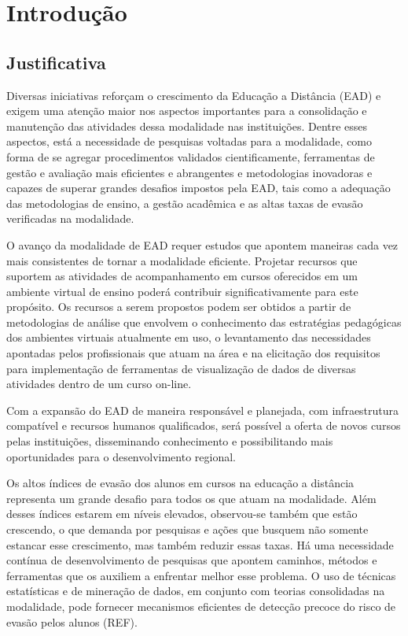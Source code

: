 \chapter{Introdução}

\section{Justificativa}

Diversas iniciativas reforçam o crescimento da Educação a Distância (EAD) e
exigem uma atenção maior nos aspectos importantes para a consolidação e
manutenção das atividades dessa modalidade nas instituições. Dentre esses
aspectos, está a necessidade de pesquisas voltadas para a modalidade, como forma
de se agregar procedimentos validados cientificamente, ferramentas de gestão e
avaliação mais eficientes e abrangentes e metodologias inovadoras e capazes de
superar grandes desafios impostos pela EAD, tais como a adequação das
metodologias de ensino, a gestão acadêmica e as altas taxas de evasão
verificadas na modalidade.

O avanço da modalidade de EAD requer estudos que apontem maneiras cada vez mais
consistentes de tornar a modalidade eficiente. Projetar recursos que suportem as
atividades de acompanhamento em cursos oferecidos em um ambiente virtual de
ensino poderá contribuir significativamente para este propósito. Os recursos a
serem propostos podem ser obtidos a partir de metodologias de análise que
envolvem o conhecimento das estratégias pedagógicas dos ambientes virtuais
atualmente em uso, o levantamento das necessidades apontadas pelos profissionais
que atuam na área e na elicitação dos requisitos para implementação de
ferramentas de visualização de dados de diversas atividades dentro de um curso
on-line.

Com a expansão do EAD de maneira responsável e planejada, com infraestrutura
compatível e recursos humanos qualificados, será possível a oferta de novos
cursos pelas instituições, disseminando conhecimento e possibilitando mais
oportunidades para o desenvolvimento regional.

Os altos índices de evasão dos alunos em cursos na educação a distância
representa um grande desafio para todos os que atuam na modalidade. Além desses
índices estarem em níveis elevados, observou-se também que estão crescendo, o
que demanda por pesquisas e ações que busquem não somente estancar esse
crescimento, mas também reduzir essas taxas. Há uma necessidade contínua de
desenvolvimento de pesquisas que apontem caminhos, métodos e ferramentas que os
auxiliem a enfrentar melhor esse problema. O uso de técnicas estatísticas e de
mineração de dados, em conjunto com teorias consolidadas na modalidade, pode
fornecer mecanismos eficientes de detecção precoce do risco de evasão pelos
alunos (REF).

